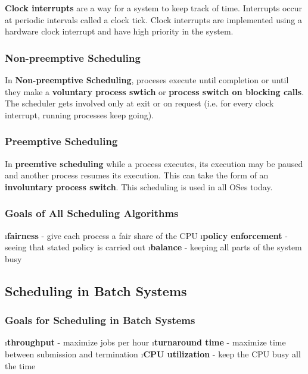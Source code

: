 \documentclass{article}
\begin{document}
    \textbf{Clock interrupts} are a way for a system to keep track of time. Interrupts occur at periodic intervals called a clock tick. Clock interrupts are implemented using a hardware clock interrupt and have high priority in the system. 

    \subsubsection{Non-preemptive Scheduling}
    
    In \textbf{Non-preemptive Scheduling}, proceses execute until completion or until they make a \textbf{voluntary process swtich} or \textbf{process switch on blocking calls}. The scheduler gets involved only at exit or on request (i.e. for every clock interrupt, running processes keep going).

    \subsubsection{Preemptive Scheduling}

    In \textbf{preemtive scheduling} while a process executes, its execution may be paused and another process resumes its execution. This can take the form of an \textbf{involuntary process switch}. This scheduling is used in all OSes today. 

    \subsubsection{Goals of All Scheduling Algorithms}

    \bl
    \i \textbf{fairness} - give each process a fair share of the CPU
    \i \textbf{policy enforcement} - seeing that stated policy is carried out
    \i \textbf{balance} - keeping all parts of the system busy
    \el
        
\subsection{Scheduling in Batch Systems}

    \subsubsection{Goals for Scheduling in Batch Systems}
    \bl
    \i \textbf{throughput} - maximize jobs per hour
    \i \textbf{turnaround time} - maximize time between submission and termination
    \i \textbf{CPU utilization} - keep the CPU busy all the time
    \el
\end{document}
